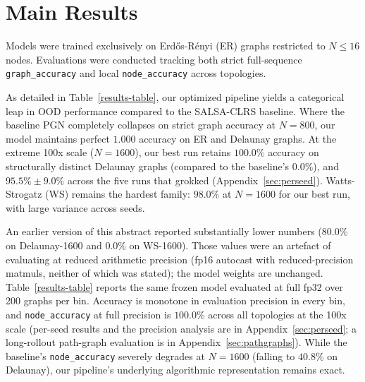 \documentclass{article}
\begin{document}
\section{Main Results}

Models were trained exclusively on Erd\H{o}s-R\'{e}nyi (ER) graphs restricted to $N \le 16$ nodes. Evaluations were conducted tracking both strict full-sequence \texttt{graph\_accuracy} and local \texttt{node\_accuracy} across topologies.

As detailed in Table~\ref{results-table}, our optimized pipeline yields a categorical leap in OOD performance compared to the SALSA-CLRS baseline. Where the baseline PGN completely collapses on strict graph accuracy at $N=800$, our model maintains perfect $1.000$ accuracy on ER and Delaunay graphs. At the extreme 100x scale ($N=1600$), our best run retains $100.0\%$ accuracy on structurally distinct Delaunay graphs (compared to the baseline's $0.0\%$), and $95.5\% \pm 9.0\%$ across the five runs that grokked (Appendix~\ref{sec:perseed}). Watts-Strogatz (WS) remains the hardest family: $98.0\%$ at $N=1600$ for our best run, with large variance across seeds.

An earlier version of this abstract reported substantially lower numbers ($80.0\%$ on Delaunay-1600 and $0.0\%$ on WS-1600). Those values were an artefact of evaluating at reduced arithmetic precision (fp16 autocast with reduced-precision matmuls, neither of which was stated); the model weights are unchanged. Table~\ref{results-table} reports the same frozen model evaluated at full fp32 over 200 graphs per bin. Accuracy is monotone in evaluation precision in every bin, and \texttt{node\_accuracy} at full precision is $100.0\%$ across all topologies at the 100x scale (per-seed results and the precision analysis are in Appendix~\ref{sec:perseed}; a long-rollout path-graph evaluation is in Appendix~\ref{sec:pathgraphs}). While the baseline's \texttt{node\_accuracy} severely degrades at $N=1600$ (falling to $40.8\%$ on Delaunay), our pipeline's underlying algorithmic representation remains exact.
\end{document}
